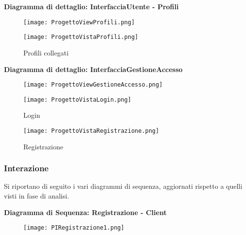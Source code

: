 \textbf{Diagramma di dettaglio: InterfacciaUtente - Profili}
\begin{figure}[h!]
    \begin{center}
        \texttt{[image: ProgettoViewProfili.png]}
    \end{center}
\end{figure}

\begin{figure}[h!]
    \centering
    \texttt{[image: ProgettoVistaProfili.png]}
    \caption{Profili collegati}
\end{figure}

\newpage

\textbf{Diagramma di dettaglio: InterfacciaGestioneAccesso}

\begin{figure}[h!]
    \begin{center}
        \texttt{[image: ProgettoViewGestioneAccesso.png]}
    \end{center}
\end{figure}

\begin{figure}[h!]
    \centering
    \texttt{[image: ProgettoVistaLogin.png]}
    \caption{Login}
\end{figure}
\begin{figure}[h!]
    \centering
    \texttt{[image: ProgettoVistaRegistrazione.png]}
    \caption{Registrazione}
\end{figure}

\clearpage



\subsubsection{Interazione}


Si riportano di seguito i vari diagrammi di sequenza, aggiornati rispetto a quelli visti in fase di analisi.\\
\vspace{3em}

\textbf{Diagramma di Sequenza: Registrazione - Client}
\begin{figure}[h!]
    \centering
    \texttt{[image: PIRegistrazione1.png]}
\end{figure}

